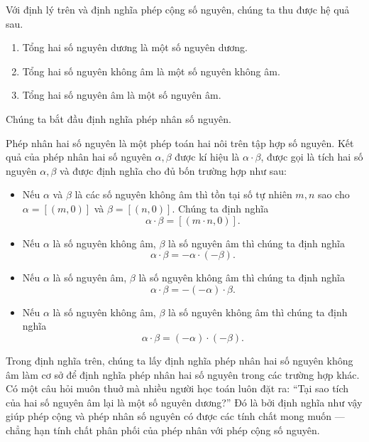 Với định lý trên và định nghĩa phép cộng số nguyên, chúng ta thu được hệ quả sau.
\begin{corollary}\label{corollary:positivity-negativity-nonnegativity-of-sum-of-integers}
    \begin{enumerate}[label={(\roman*)}]
        \item Tổng hai số nguyên dương là một số nguyên dương.
        \item Tổng hai số nguyên không âm là một số nguyên không âm.
        \item Tổng hai số nguyên âm là một số nguyên âm.
    \end{enumerate}
\end{corollary}

Chúng ta bắt đầu định nghĩa phép nhân số nguyên.
\begin{definition}
    Phép nhân hai số nguyên là một phép toán hai nôi trên tập hợp số nguyên. Kết quả của phép nhân hai số nguyên $\alpha, \beta$ được kí hiệu là $\alpha\cdot\beta$, được gọi là tích hai số nguyên $\alpha, \beta$ và được định nghĩa cho đủ bốn trường hợp như sau:
    \begin{itemize}[itemsep=0pt]
        \item Nếu $\alpha$ và $\beta$ là các số nguyên không âm thì tồn tại số tự nhiên $m, n$ sao cho $\alpha = [(m, 0)]$ và $\beta = [(n, 0)]$. Chúng ta định nghĩa
              \[
                  \alpha\cdot\beta = [(m\cdot n, 0)].
              \]
        \item Nếu $\alpha$ là số nguyên không âm, $\beta$ là số nguyên âm thì chúng ta định nghĩa
              \[
                  \alpha\cdot\beta = -\alpha\cdot(-\beta).
              \]
        \item Nếu $\alpha$ là số nguyên âm, $\beta$ là số nguyên không âm thì chúng ta định nghĩa
              \[
                  \alpha\cdot\beta = -(-\alpha)\cdot \beta.
              \]
        \item Nếu $\alpha$ là số nguyên không âm, $\beta$ là số nguyên không âm thì chúng ta định nghĩa
              \[
                  \alpha\cdot\beta = (-\alpha)\cdot(-\beta).
              \]
    \end{itemize}
\end{definition}

Trong định nghĩa trên, chúng ta lấy định nghĩa phép nhân hai số nguyên không âm làm cơ sở để định nghĩa phép nhân hai số nguyên trong các trường hợp khác. Có một câu hỏi muôn thuở mà nhiều người học toán luôn đặt ra: ``Tại sao tích của hai số nguyên âm lại là một số nguyên dương?'' Đó là bởi định nghĩa như vậy giúp phép cộng và phép nhân số nguyên có được các tính chất mong muốn --- chẳng hạn tính chất phân phối của phép nhân với phép cộng số nguyên.


